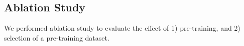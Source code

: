 
\subsection{Ablation Study}
\label{ssec:ablation_study}

We performed ablation study to evaluate the effect of 1) pre-training, and 2) selection of a pre-training dataset.
%

